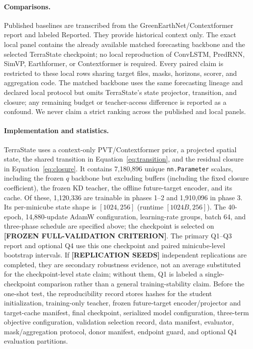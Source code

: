 \documentclass[letterpaper]{article} %
\begin{document}
\paragraph{Comparisons.}
Published baselines are transcribed from the GreenEarthNet/Contextformer report
\cite{benson2024multimodal} and labeled Reported. They provide historical
context only. The exact local panel contains the already available matched
forecasting backbone and the selected TerraState checkpoint; no local reproduction
of ConvLSTM, PredRNN, SimVP, Earthformer, or Contextformer is required. Every
paired claim is restricted to these local rows sharing target files, masks,
horizons, scorer, and aggregation code. The matched backbone uses the same forecasting
lineage and declared local protocol but omits TerraState's state projector,
transition, and closure; any remaining budget or teacher-access difference is
reported as a confound. We never claim a strict ranking across the published
and local panels.

\paragraph{Implementation and statistics.}
TerraState uses a context-only PVT/Contextformer prior, a projected
spatial state, the shared transition in Equation~\ref{eq:transition}, and the
residual closure in Equation~\ref{eq:closure}. It contains 7,180,896 unique
\texttt{nn.Parameter} scalars, including the frozen $q$ backbone but excluding
buffers (including the fixed closure coefficient), the frozen KD teacher, the
offline future-target encoder, and its cache. Of these, 1,120,336 are trainable
in phases 1--2 and 1,910,096 in phase 3. Its per-minicube state shape is
$[1024,256]$ (runtime $[1024B,256]$). The 40-epoch, 14,880-update AdamW
configuration, learning-rate groups, batch 64, and three-phase schedule are
specified above; the checkpoint is selected on \textbf{[FROZEN FULL-VALIDATION
CRITERION]}. The primary Q1--Q3 report and optional Q4 use this one checkpoint
and paired minicube-level bootstrap intervals. If
\textbf{[REPLICATION SEEDS]} independent replications are completed, they are
secondary robustness evidence, not an average substituted for the
checkpoint-level state claim; without them, Q1 is labeled a single-checkpoint
comparison rather than a general training-stability claim. Before the one-shot
test, the reproducibility record stores hashes for the student initialization,
training-only teacher, frozen future-target encoder/projector and target-cache
manifest, final checkpoint, serialized model configuration, three-term
objective configuration, validation selection record, data manifest,
evaluator, mask/aggregation protocol, donor manifest, endpoint guard, and
optional Q4 evaluation partitions.
\end{document}

